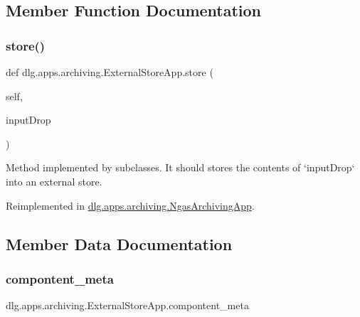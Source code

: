 \subsection{Member Function Documentation}
\mbox{\label{classdlg_1_1apps_1_1archiving_1_1_external_store_app_a6a41c4de0c0a291d8d7924563a592a64}} 
\subsubsection{\texorpdfstring{store()}{store()}}
{\footnotesize\ttfamily def dlg.\+apps.\+archiving.\+External\+Store\+App.\+store (\begin{DoxyParamCaption}\item[{}]{self,  }\item[{}]{input\+Drop }\end{DoxyParamCaption})}

\begin{DoxyVerb}Method implemented by subclasses. It should stores the contents of
`inputDrop` into an external store.
\end{DoxyVerb}
 

Reimplemented in \mbox{\hyperlink{classdlg_1_1apps_1_1archiving_1_1_ngas_archiving_app_a6823199a640bdd4c5991b8728d7af490}{dlg.\+apps.\+archiving.\+Ngas\+Archiving\+App}}.



\subsection{Member Data Documentation}
\mbox{\label{classdlg_1_1apps_1_1archiving_1_1_external_store_app_ae526984e031db40f72af2dd9af3950f0}} 
\subsubsection{\texorpdfstring{compontent\_meta}{compontent\_meta}}
{\footnotesize\ttfamily dlg.\+apps.\+archiving.\+External\+Store\+App.\+compontent\+\_\+meta\hspace{0.3cm}{\ttfamily [static]}}

